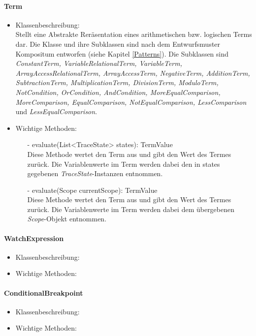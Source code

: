 \documentclass[parskip=full]{scrartcl}
\begin{document}
\paragraph{Term}
\begin{itemize}
\item Klassenbeschreibung: \\
Stellt eine Abstrakte Reräsentation eines arithmetischen bzw. logischen Terms dar. Die Klasse und ihre Subklassen sind nach dem Entwurfsmuster Kompositum entworfen (siehe Kapitel \ref{Patterns}). Die Subklassen sind \textit{ConstantTerm, VariableRelationalTerm, VariableTerm, ArrayAccessRelationalTerm, ArrayAccessTerm, NegativeTerm, AdditionTerm, SubtractionTerm, MultiplicationTerm, DivisionTerm, ModuloTerm, NotCondition, OrCondition, AndCondition, MoreEqualComparison, MoreComparison, EqualComparison, NotEqualComparison, LessComparison} und \textit{LessEqualComparison}.
\item Wichtige Methoden:\\
\begin{itemize}
\item[-]evaluate(List<TraceState> states): TermValue\\
Diese Methode wertet den Term aus und gibt den Wert des Termes zurück. Die Variablenwerte im Term werden dabei den in states gegebenen \textit{TraceState}-Instanzen entnommen.
\item[-]evaluate(Scope currentScope): TermValue\\
Diese Methode wertet den Term aus und gibt den Wert des Termes zurück. Die Variablenwerte im Term werden dabei dem übergebenen \textit{Scope}-Objekt entnommen.
\end{itemize}
\end{itemize}
\paragraph{WatchExpression}
\begin{itemize}
\item Klassenbeschreibung: \\

\item Wichtige Methoden:\\


\end{itemize}
\paragraph{ConditionalBreakpoint}
\begin{itemize}
\item Klassenbeschreibung: \\

\item Wichtige Methoden:\\


\end{itemize}
\end{document}
